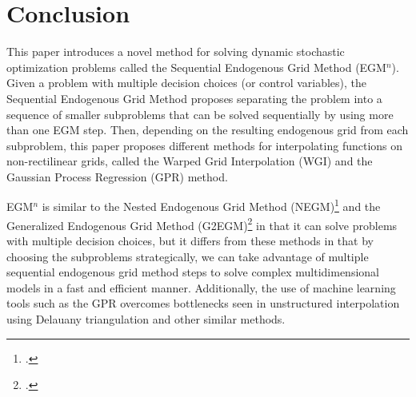 \documentclass[\econtexRoot/SequentialEGM]{subfiles}
\begin{document}
\hypertarget{conclusion}{}
\par\section{Conclusion}
\notinsubfile{\label{sec:conclusion}}


This paper introduces a novel method for solving dynamic stochastic optimization problems called the Sequential Endogenous Grid Method (EGM$^n$). Given a problem with multiple decision choices (or control variables), the Sequential Endogenous Grid Method proposes separating the problem into a sequence of smaller subproblems that can be solved sequentially by using more than one EGM step. Then, depending on the resulting endogenous grid from each subproblem, this paper proposes different methods for interpolating functions on non-rectilinear grids, called the Warped Grid Interpolation (WGI) and the Gaussian Process Regression (GPR) method.

EGM$^n$ is similar to the Nested Endogenous Grid Method (NEGM)\footnote{\cite{Druedahl2021-wl}.} and the Generalized Endogenous Grid Method (G2EGM)\footnote{\cite{Druedahl2017-vn}.} in that it can solve problems with multiple decision choices, but it differs from these methods in that by choosing the subproblems strategically, we can take advantage of multiple sequential endogenous grid method steps to solve complex multidimensional models in a fast and efficient manner. Additionally, the use of machine learning tools such as the GPR overcomes bottlenecks seen in unstructured interpolation using Delauany triangulation and other similar methods.



\end{document}
